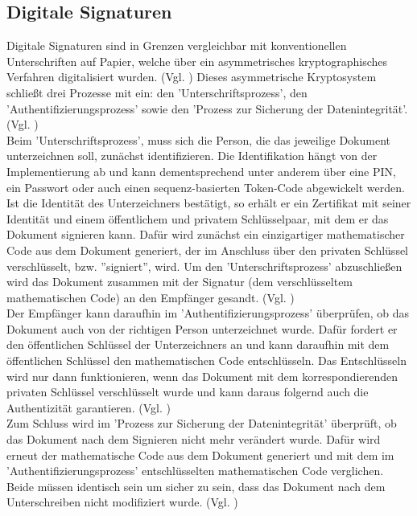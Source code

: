 \documentclass[deutsch]{lib/llncs/llncs}
\begin{document}
\subsection{Digitale Signaturen}
Digitale Signaturen sind in Grenzen vergleichbar mit konventionellen Unterschriften auf Papier, welche über ein asymmetrisches kryptographisches Verfahren digitalisiert wurden. (Vgl. \cite[S. 297]{Zitat06}) Dieses asymmetrische Kryptosystem schließt drei Prozesse mit ein: den 'Unterschriftsprozess', den 'Authentifizierungsprozess' sowie den 'Prozess zur Sicherung der Datenintegrität'. (Vgl. \cite[S. 4]{Zitat05}) \\
Beim 'Unterschriftsprozess', muss sich die Person, die das jeweilige Dokument unterzeichnen soll, zunächst identifizieren. Die Identifikation hängt von der Implementierung ab und kann dementsprechend unter anderem über eine PIN, ein Passwort oder auch einen sequenz-basierten Token-Code abgewickelt werden. Ist die Identität des Unterzeichners bestätigt, so erhält er ein Zertifikat mit seiner Identität und einem öffentlichem und privatem Schlüsselpaar, mit dem er das Dokument signieren kann. Dafür wird zunächst ein einzigartiger mathematischer Code aus dem Dokument generiert, der im Anschluss über den privaten Schlüssel verschlüsselt, bzw. ''signiert'', wird. Um den 'Unterschriftsprozess' abzuschließen wird das Dokument zusammen mit der Signatur (dem verschlüsseltem mathematischen Code) an den Empfänger gesandt. (Vgl. \cite[S. 4]{Zitat05}) \\
Der Empfänger kann daraufhin im 'Authentifizierungsprozess' überprüfen, ob das Dokument auch von der richtigen Person unterzeichnet wurde. Dafür fordert er den öffentlichen Schlüssel der Unterzeichners an und kann daraufhin mit dem öffentlichen Schlüssel den mathematischen Code entschlüsseln. Das Entschlüsseln wird nur dann funktionieren, wenn das Dokument mit dem korrespondierenden privaten Schlüssel verschlüsselt wurde und kann daraus folgernd auch die Authentizität garantieren. (Vgl. \cite[S. 4]{Zitat05}) \\
Zum Schluss wird im 'Prozess zur Sicherung der Datenintegrität' überprüft, ob das Dokument nach dem Signieren nicht mehr verändert wurde. Dafür wird erneut der mathematische Code aus dem Dokument generiert und mit dem im 'Authentifizierungsprozess' entschlüsselten mathematischen Code verglichen. Beide müssen identisch sein um sicher zu sein, dass das Dokument nach dem Unterschreiben nicht modifiziert wurde.  (Vgl. \cite[S. 4]{Zitat05})
\end{document}
